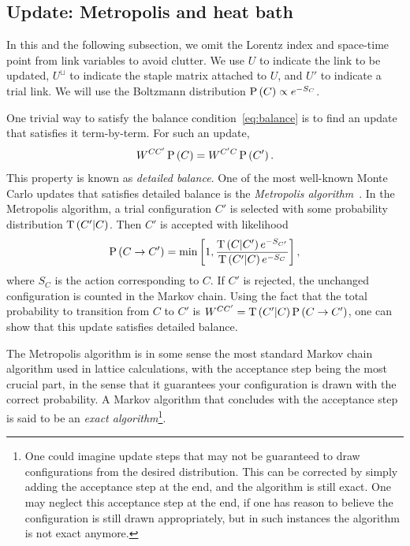 \subsection{Update: Metropolis and heat bath}
In this and the following subsection,
we omit the Lorentz index and space-time point from link variables to
avoid clutter.  We use $U$ to indicate the link to be updated, 
$U^\sqcup$ to indicate the staple matrix attached to $U$, and
$U'$ to indicate a trial link. We will use the Boltzmann
distribution $\operatorname{P}\left(C\right)\propto e^{-S_C}$.

One trivial way to satisfy the balance condition~\eqref{eq:balance} is
to find an update that satisfies it term-by-term. For such an update, 
\begin{equation}\label{eq:detailedbalance}\index{detailed balance}
    W^{CC'}\pr{C}=W^{C'C}\pr{C'}.
\end{equation}
This property is known as {\it detailed balance}.
One of the most well-known Monte Carlo updates that satisfies detailed
balance is the {\it Metropolis algorithm}~\cite{metropolis_equation_1953}. 
In the Metropolis algorithm, a trial configuration $C'$ is selected 
with some probability distribution $\operatorname{T}\left(C'|C\right)$. Then $C'$
is accepted with likelihood
\begin{equation}\label{eq:metupdate}
  \operatorname{P}\left(C\to C'\right)=\min\left[1,\frac{\operatorname{T}\left(C|C'\right)e^{-S_{C'}}}
    {\operatorname{T}\left(C'|C\right)e^{-S_C}}\right],
\end{equation}
where $S_C$ is the action corresponding to $C$. 
If $C'$ is rejected, the unchanged configuration is counted
in the Markov chain. Using the fact that the total probability
to transition from $C$ to $C'$ is $W^{CC'}=\operatorname{T}\left(C'|C\right)\operatorname{P}\left(C\to C'\right)$, one
can show that this update satisfies detailed balance.

The Metropolis algorithm is in some sense the most standard Markov chain
algorithm used in lattice calculations, with the acceptance step
 being the most crucial part, in the sense that
it guarantees your configuration is drawn with the correct probability.
A Markov algorithm that concludes with the acceptance step is
said to be an {\it exact algorithm}\footnote{One
could imagine update steps that may not be guaranteed to draw configurations
from the desired distribution. This can be corrected by simply adding
the acceptance step at the end, and the algorithm is still exact.
One may neglect this acceptance step at the end, if one has reason to
believe the configuration is still drawn appropriately, but in such
instances the algorithm is not exact anymore.}.


